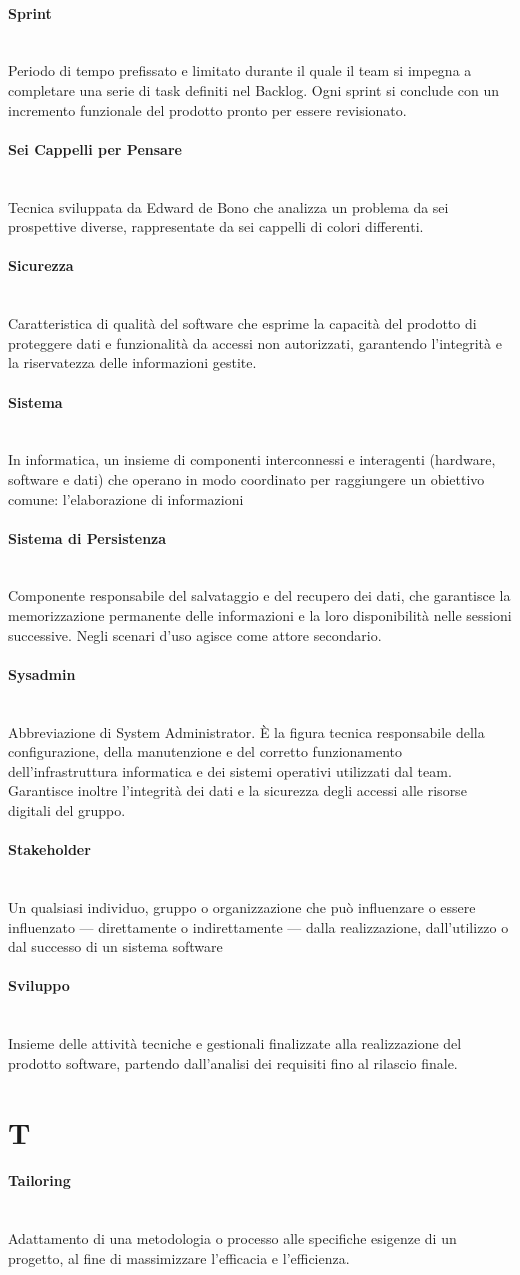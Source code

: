 \documentclass[a4paper, 10pt, colorlinks=true, linkcolor=black, urlcolor=blue, citecolor=blue, hidelinks]{article}
\newcommand{\glossaryterm}[2]{
    \paragraph{#1 \label{term:#1}} \mbox{} \\
    #2
    \vspace{0.5em}
}
\begin{document}
\glossaryterm{Sprint}{Periodo di tempo prefissato e limitato durante il quale il team si impegna a completare una serie di task definiti nel Backlog. Ogni sprint si conclude con un incremento funzionale del prodotto pronto per essere revisionato.}

\glossaryterm{Sei Cappelli per Pensare}{Tecnica sviluppata da Edward de Bono che analizza un problema da sei prospettive diverse, rappresentate da sei cappelli di colori differenti.}

\glossaryterm{Sicurezza}{Caratteristica di qualità del software che esprime la capacità del prodotto di proteggere dati e funzionalità da accessi non autorizzati, garantendo l'integrità e la riservatezza delle informazioni gestite.}

\glossaryterm{Sistema}{In informatica, un insieme di componenti interconnessi e interagenti (hardware, software e dati) che operano in modo coordinato per raggiungere un obiettivo comune: l'elaborazione di informazioni}

\glossaryterm{Sistema di Persistenza}{Componente responsabile del salvataggio e del recupero dei dati, che garantisce la memorizzazione permanente delle informazioni e la loro disponibilità nelle sessioni successive. Negli scenari d'uso agisce come attore secondario.}

\glossaryterm{Sysadmin}{Abbreviazione di System Administrator. È la figura tecnica responsabile della configurazione, della manutenzione e del corretto funzionamento dell'infrastruttura informatica e dei sistemi operativi utilizzati dal team. Garantisce inoltre l'integrità dei dati e la sicurezza degli accessi alle risorse digitali del gruppo.}

\glossaryterm{Stakeholder}{Un qualsiasi individuo, gruppo o organizzazione che può influenzare o essere influenzato — direttamente o indirettamente — dalla realizzazione, dall'utilizzo o dal successo di un sistema software}

\glossaryterm{Sviluppo}{Insieme delle attività tecniche e gestionali finalizzate alla realizzazione del prodotto software, partendo dall'analisi dei requisiti fino al rilascio finale.}

\newpage

\section*{T}

\glossaryterm{Tailoring}{Adattamento di una metodologia o processo alle specifiche esigenze di un progetto, al fine di massimizzare l'efficacia e l'efficienza.}
\end{document}
